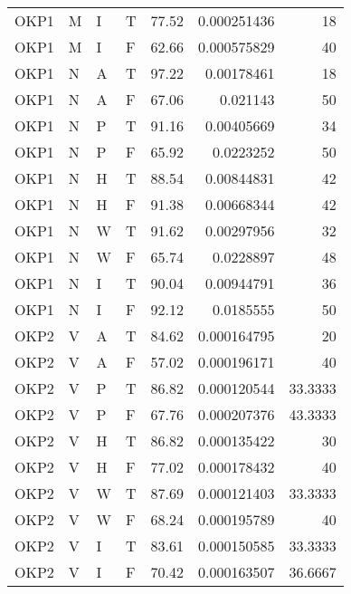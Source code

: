 \begin{longtable}{llllrrr}
    OKP1     & M     & I     & T          & 77.52      & 0.000251436 & 18       \\
    OKP1     & M     & I     & F          & 62.66      & 0.000575829 & 40       \\
    OKP1     & N     & A     & T          & 97.22      & 0.00178461  & 18       \\
    OKP1     & N     & A     & F          & 67.06      & 0.021143    & 50       \\
    OKP1     & N     & P     & T          & 91.16      & 0.00405669  & 34       \\
    OKP1     & N     & P     & F          & 65.92      & 0.0223252   & 50       \\
    OKP1     & N     & H     & T          & 88.54      & 0.00844831  & 42       \\
    OKP1     & N     & H     & F          & 91.38      & 0.00668344  & 42       \\
    OKP1     & N     & W     & T          & 91.62      & 0.00297956  & 32       \\
    OKP1     & N     & W     & F          & 65.74      & 0.0228897   & 48       \\
    OKP1     & N     & I     & T          & 90.04      & 0.00944791  & 36       \\
    OKP1     & N     & I     & F          & 92.12      & 0.0185555   & 50       \\
    OKP2     & V     & A     & T          & 84.62      & 0.000164795 & 20       \\
    OKP2     & V     & A     & F          & 57.02      & 0.000196171 & 40       \\
    OKP2     & V     & P     & T          & 86.82      & 0.000120544 & 33.3333  \\
    OKP2     & V     & P     & F          & 67.76      & 0.000207376 & 43.3333  \\
    OKP2     & V     & H     & T          & 86.82      & 0.000135422 & 30       \\
    OKP2     & V     & H     & F          & 77.02      & 0.000178432 & 40       \\
    OKP2     & V     & W     & T          & 87.69      & 0.000121403 & 33.3333  \\
    OKP2     & V     & W     & F          & 68.24      & 0.000195789 & 40       \\
    OKP2     & V     & I     & T          & 83.61      & 0.000150585 & 33.3333  \\
    OKP2     & V     & I     & F          & 70.42      & 0.000163507 & 36.6667  \\

\end{longtable}
